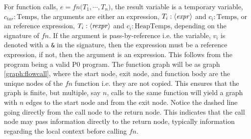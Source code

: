 For function calls, $e = \mathit{fn}\texttt{(}T_1,\cdots, T_n\texttt{)}$, the result variable is a temporary variable, $c_{tar}:\text{Temps}$, the arguments are either an expression, $T_i : \langle\mathit{expr}\rangle$ and $c_i : \text{Temps}$, or an reference expression, $T_i : \langle\mathit{rexpr}\rangle$ and $c_i : \text{HeapTemps}$, depending on the signature of $\mathit{fn}$. If the argument is pass-by-reference i.e. the variable, $v_i$ is denoted with a \texttt{\&} in the signature, then the expression must be a reference expression, if not, then the argument is an expression. This follows from the program being a valid P0 program. The function graph will be as graph \ref{graph:flowcall}, where the start node, exit node, and function body are the unique nodes of the $\mathit{fn}$ function i.e. they are not copied. This ensures that the graph is finite, but multiple, say $n$, calls to the same function will yield a graph with $n$ edges to the start node and from the exit node. Notice the dashed line going directly from the call node to the return node. This indicates that the call node may pass information directly to the return node, typically information regarding the local context before calling $\mathit{fn}$.

\begin{graph}
\captionsetup{justification=centering}
\hspace*{\fill}
\hspace*{\fill}
\end{graph}

